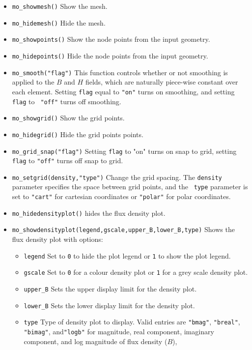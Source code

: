 \begin{itemize}
\item{\verb+mo_showmesh()+} Show the mesh.
\item{\verb+mo_hidemesh()+} Hide the mesh.
\item{\verb+mo_showpoints()+} Show the node points from the input geometry.
\item{\verb+mo_hidepoints()+} Hide the node points from the input geometry.
\item{\tt mo\_smooth("flag")} This function controls whether or not smoothing
is applied to the $B$ and $H$ fields, which are naturally
piece-wise constant over each element.  Setting {\tt flag} equal to
{\tt "on"} turns on smoothing, and setting {\tt flag} to {\tt
"off"} turns off smoothing.
\item{\verb+mo_showgrid()+} Show the grid points.
\item{\verb+mo_hidegrid()+} Hide the grid points points.
\item{\verb+mo_grid_snap("flag")+}
Setting {\tt flag} to "on" turns on snap to grid, setting {\tt
flag} to {\tt "off"} turns off snap to grid.
\item{\verb+mo_setgrid(density,"type")+} Change the grid spacing.  The {\tt density}
parameter specifies the space between grid points, and the {\tt
type} parameter is set to {\tt "cart"} for cartesian coordinates or
{\tt "polar"} for polar coordinates.
\item{\verb+mo_hidedensityplot()+} hides the flux density plot.
\item{\verb+mo_showdensityplot(legend,gscale,upper_B,lower_B,type)+}
Shows the flux density plot with options:
        \begin{itemize}
        \item {\tt legend} Set to {\tt 0} to hide the plot legend or {\tt 1} to show the plot
        legend.
        \item {\tt gscale} Set to {\tt 0} for a colour density plot or {\tt 1} for a grey scale density
        plot.
        \item{\verb+upper_B+} Sets the upper display limit for the density
        plot.
        \item{\verb+lower_B+} Sets the lower display limit for the density
        plot.
        \item{\tt type} Type of density plot to display. Valid
        entries are {\tt "bmag"}, {\tt "breal"},  {\tt "bimag"}, and{\tt "logb"} for
        magnitude, real component,  imaginary component, and log magnitude of flux density ($B$),

\end{itemize}
\end{itemize}
